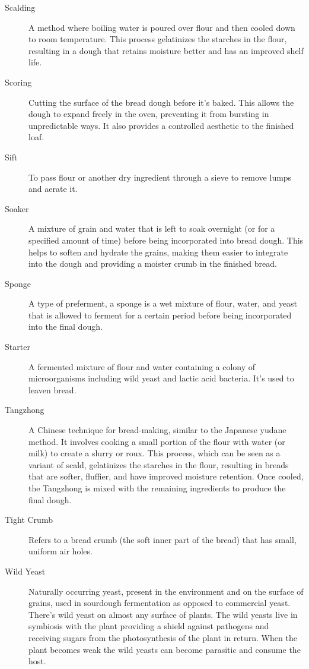 \begin{description}
\item[Scalding] A method where boiling water is poured over flour and then cooled
down to room temperature. This process gelatinizes the starches in the flour,
resulting in a dough that retains moisture better and has an improved shelf life.

\item[Scoring] Cutting the surface of the bread dough before it's baked. This
allows the dough to expand freely in the oven, preventing it from bursting in
unpredictable ways. It also provides a controlled aesthetic to the finished loaf.

\item[Sift] To pass flour or another dry ingredient through a sieve to remove lumps
and aerate it.

\item[Soaker] A mixture of grain and water that is left to soak overnight (or for a
specified amount of time) before being incorporated into bread dough. This helps to
soften and hydrate the grains, making them easier to integrate into the dough and
providing a moister crumb in the finished bread.

\item[Sponge] A type of preferment, a sponge is a wet mixture of flour, water, and
yeast that is allowed to ferment for a certain period before being incorporated into
the final dough.

\item[Starter] A fermented mixture of flour and water containing a colony of
microorganisms including wild yeast and lactic acid bacteria. It's used to leaven
bread.

\item[Tangzhong] A Chinese technique for bread-making, similar to the
Japanese yudane method. It involves cooking a small portion of the flour
with water (or milk) to create a slurry or roux. This process, which can be seen as a
variant of scald, gelatinizes the starches in the flour, resulting in breads
that are softer, fluffier, and have improved moisture retention. Once cooled, the
Tangzhong is mixed with the remaining ingredients to produce the final dough.

\item[Tight Crumb] Refers to a bread crumb (the soft inner part of the bread) that
has small, uniform air holes.

\item[Wild Yeast] Naturally occurring yeast, present in the environment and on the
surface of grains, used in sourdough fermentation as opposed to commercial yeast.
There’s wild yeast on almost any surface of plants. The wild yeasts live in symbiosis
with the plant providing a shield against pathogens and receiving sugars from the
photosynthesis of the plant in return. When the plant becomes weak the wild yeasts
can become parasitic and consume the host.


\end{description}
